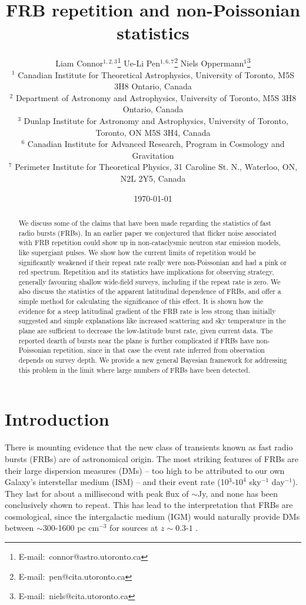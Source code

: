 \documentclass[useAMS,usenatbib]{mn2e}
\title{FRB repetition and non-Poissonian statistics}
\author[Connor et al.]{
Liam Connor$^{1,2,3}$\thanks{E-mail:\ connor@astro.utoronto.ca}
Ue-Li Pen$^{1, 6, 7}$\thanks{E-mail:\ pen@cita.utoronto.ca}
Niels Oppermann$^{1}$\thanks{E-mail:\ niels@cita.utoronto.ca}
\\
$^1$ Canadian Institute for Theoretical Astrophysics, University of Toronto, M5S 3H8 Ontario, Canada
\\
$^2$ Department of Astronomy and Astrophysics, University of Toronto, 
M5S 3H8 Ontario, Canada
\\
$^3$ Dunlap Institute for Astronomy and Astrophysics, University of Toronto,
Toronto, ON M5S 3H4, Canada
\\
$^6$ Canadian Institute for Advanced Research, Program in Cosmology
and Gravitation
\\
$^7$ Perimeter Institute for Theoretical Physics, 31 Caroline St. N., Waterloo, ON, N2L 2Y5, Canada
}
\begin{document}
\date{\today}
\pagerange{\pageref{firstpage}--\pageref{lastpage}} 
\maketitle
\label{firstpage}

\begin{abstract}
We discuss some of the claims that have been made regarding the statistics of 
fast radio bursts (FRBs). In an earlier paper \citep{2015arXiv150505535C} 
we conjectured that flicker noise associated 
with FRB repetition could show up in non-cataclysmic neutron star emission models,
like supergiant pulses. We show how the current limits of repetition 
would be significantly weakened if their repeat rate really were non-Poissonian
and had a pink or red spectrum.
Repetition and its statistics have implications for observing strategy, generally favouring 
shallow wide-field surveys, including if the repeat rate is zero. 
We also discuss the statistics of the apparent latitudinal dependence of FRBs, and offer
a simple method for calculating the significance of this effect. It is shown how 
the evidence for a steep latitudinal gradient of the FRB rate is less strong than initially suggested 
and simple explanations like increased scattering and sky temperature 
in the plane are sufficient to decrease the low-latitude burst rate, given current data.
The reported dearth of bursts near the plane is further complicated if FRBs have 
non-Poissonian repetition, since in that case the event rate inferred from observation
depends on survey depth. We provide a new general Bayesian framework for addressing 
this problem in the limit where large numbers of FRBs have been detected.

\end{abstract}
\begin{keywords}
\end{keywords}

\newcommand{\be}{\begin{eqnarray}}
\newcommand{\ee}{\end{eqnarray}}
\newcommand{\beq}{\begin{equation}}
\newcommand{\eeq}{\end{equation}}

\section{Introduction}
There is mounting evidence that the new class of transients 
known as fast radio bursts (FRBs) are of astronomical origin.
The most striking features of FRBs are their large dispersion
measures (DMs) -- too high to be attributed to our own Galaxy's
interstellar medium (ISM) --
and their event rate (10$^3$-$10^4$ sky$^{-1}$ day$^{-1}$). They
last for about a millisecond with peak flux of $\sim$Jy, and none
has been conclusively shown to repeat. This has lead to the 
interpretation that FRBs are cosmological,
since the intergalactic medium (IGM) would naturally provide
DMs between $\sim$300-1600 pc cm$^{-3}$ for sources at 
$z\sim0.3$-$1$ \citep{2013Sci...341...53T}. 
\end{document}
